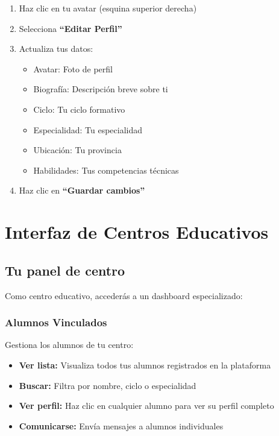 \documentclass[a4paper]{report}
\begin{document}
\begin{enumerate}
  \item Haz clic en tu avatar (esquina superior derecha)
  \item Selecciona \textbf{``Editar Perfil''}
  \item Actualiza tus datos:
  \begin{itemize}
    \item Avatar: Foto de perfil
    \item Biografía: Descripción breve sobre ti
    \item Ciclo: Tu ciclo formativo
    \item Especialidad: Tu especialidad
    \item Ubicación: Tu provincia
    \item Habilidades: Tus competencias técnicas
  \end{itemize}
  \item Haz clic en \textbf{``Guardar cambios''}
\end{enumerate}

\newpage

\chapter{Interfaz de Centros Educativos}

\section{Tu panel de centro}

Como centro educativo, accederás a un dashboard especializado:

\subsection{Alumnos Vinculados}

Gestiona los alumnos de tu centro:

\begin{itemize}
  \item \textbf{Ver lista:} Visualiza todos tus alumnos registrados en la plataforma
  \item \textbf{Buscar:} Filtra por nombre, ciclo o especialidad
  \item \textbf{Ver perfil:} Haz clic en cualquier alumno para ver su perfil completo
  \item \textbf{Comunicarse:} Envía mensajes a alumnos individuales
\end{itemize}
\end{document}
